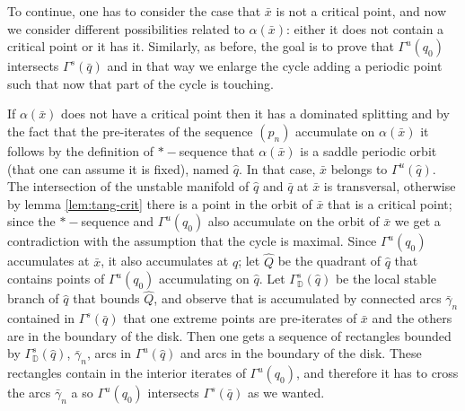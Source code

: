 \documentclass[a4paper,11pt]{article}
\theoremstyle{definition}
\def\DD{{\mathbb D}}
\def\ga{\gamma}
\def\Ga{\Gamma}
\def\al{\alpha}
\def\Ga{\Gamma}
\begin{document}
To continue, one has to consider the case that $\bar x$ is not a critical point, and now we consider different possibilities related to $\al(\bar x)$: either it does not contain a critical point or it has it. Similarly, as before, the goal is to prove that $\Ga^u(q_0)$ intersects $\Ga^s(\bar q)$ and in that way we enlarge the cycle adding a periodic point such that now that part of the cycle is touching.

If $\al(\bar x)$ does not have  a critical point then it has a dominated splitting and by the fact that the  pre-iterates of the sequence $(p_n)$ accumulate on $\al(\bar x)$ it follows by the definition of $*-$sequence that $\alpha(\bar x)$ is a saddle periodic orbit (that one can assume it is fixed), named $\hat q$. In that case, $\bar x$ belongs to $\Ga^u(\hat q)$. The intersection of the unstable manifold of $\hat q$ and $\bar q$ at $\bar x$ is transversal, otherwise by lemma \ref{lem:tang-crit} there is a point in the orbit of $\bar x$ that is a critical point; since the $*-$sequence and $\Ga^u(q_0)$ also accumulate on the orbit of $\bar x$ we get a contradiction with the assumption that the cycle is maximal.   Since $\Ga^u(q_0)$ accumulates at $\bar x$, it also accumulates at $\hat q$; let $\hat Q$ be the quadrant of $\hat q$ that contains points of $\Ga^u(q_0)$ accumulating on $\hat q.$ Let $\Ga^s_\DD(\hat q)$ be the local stable branch of $\hat q$ that bounds $\hat Q$, and observe that  is accumulated by  connected arcs $\bar \ga_n$ contained in $\Ga^s(\bar q)$ that one extreme points are pre-iterates of $\bar x$ and the others are in the boundary of the disk. Then one gets a sequence of rectangles bounded by $\Ga^s_\DD(\hat q)$, $\bar \ga_n$, arcs in $\Ga^u(\hat q)$ and arcs in the boundary of the disk. These rectangles  contain in the interior iterates of $\Ga^u(q_0)$, and therefore it has to cross  the arcs $\bar \ga_n$ a so $\Ga^u(q_0)$ intersects $\Ga^s(\bar q)$ as we wanted.
\end{document}
